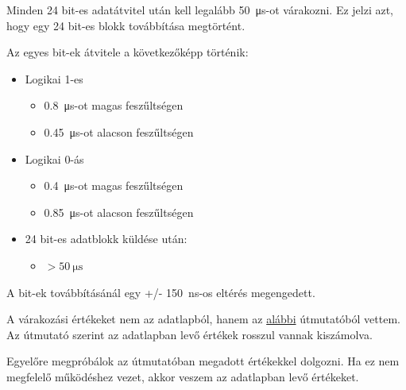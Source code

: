 \documentclass[10pt]{article} %
\begin{document}
Minden 24 bit-es adatátvitel után kell legalább \SI{50}{\micro\second}-ot várakozni. Ez jelzi azt, hogy egy 24 bit-es blokk továbbítása megtörtént.

\noindent Az egyes bit-ek átvitele a következőképp történik:

\begin{itemize}
\item Logikai 1-es
	\begin{itemize}
	\item \SI{0.8}{\micro\second}-ot magas feszűltségen
	\item \SI{0.45}{\micro\second}-ot alacson feszűltségen
	\end{itemize}
\item Logikai 0-ás
	\begin{itemize}
	\item \SI{0.4}{\micro\second}-ot magas feszűltségen
	\item \SI{0.85}{\micro\second}-ot alacson feszűltségen
	\end{itemize}
\item 24 bit-es adatblokk küldése után: 
	\begin{itemize}
		\item $ > \SI{50}{\micro\second}$
	\end{itemize}
\end{itemize}

\noindent A bit-ek továbbításánál egy +/- \SI{150}{\nano\second}-os eltérés megengedett.

A várakozási értékeket nem az adatlapból, hanem az \href{https://learn.adafruit.com/adafruit-neopixel-uberguide}{alábbi} útmutatóból vettem. Az útmutató szerint az adatlapban levő értékek rosszul vannak kiszámolva.

Egyelőre megpróbálok az útmutatóban megadott értékekkel dolgozni. Ha ez nem megfelelő működéshez vezet, akkor veszem az adatlapban levő értékeket.
\end{document}
